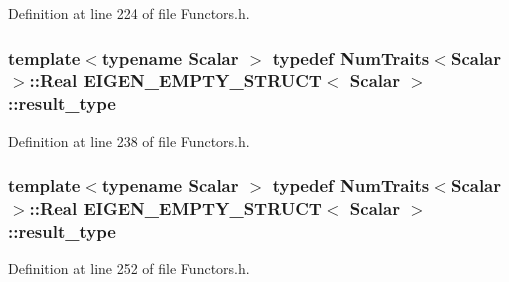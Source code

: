 Definition at line 224 of file Functors.\-h.

\hypertarget{struct_e_i_g_e_n___e_m_p_t_y___s_t_r_u_c_t_a99f2ce1c1dfd4e7ff53eadc336c7816e}{
\subsubsection[{result\-\_\-type}]{\setlength{\rightskip}{0pt plus 5cm}template$<$typename Scalar $>$ typedef {\bf Num\-Traits}$<$Scalar$>$\-::Real {\bf E\-I\-G\-E\-N\-\_\-\-E\-M\-P\-T\-Y\-\_\-\-S\-T\-R\-U\-C\-T}$<$ Scalar $>$\-::{\bf result\-\_\-type}}}\label{struct_e_i_g_e_n___e_m_p_t_y___s_t_r_u_c_t_a99f2ce1c1dfd4e7ff53eadc336c7816e}


Definition at line 238 of file Functors.\-h.

\hypertarget{struct_e_i_g_e_n___e_m_p_t_y___s_t_r_u_c_t_a99f2ce1c1dfd4e7ff53eadc336c7816e}{
\subsubsection[{result\-\_\-type}]{\setlength{\rightskip}{0pt plus 5cm}template$<$typename Scalar $>$ typedef {\bf Num\-Traits}$<$Scalar$>$\-::Real {\bf E\-I\-G\-E\-N\-\_\-\-E\-M\-P\-T\-Y\-\_\-\-S\-T\-R\-U\-C\-T}$<$ Scalar $>$\-::{\bf result\-\_\-type}}}\label{struct_e_i_g_e_n___e_m_p_t_y___s_t_r_u_c_t_a99f2ce1c1dfd4e7ff53eadc336c7816e}


Definition at line 252 of file Functors.\-h.



